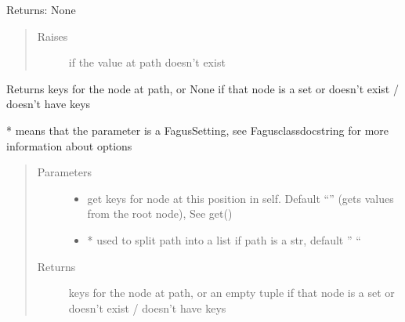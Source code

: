 \documentclass[a4paper,10pt,english]{sphinxmanual}
\begin{document}
\begin{fulllineitems}
\begin{fulllineitems}
\sphinxAtStartPar
Returns: None
\begin{quote}\begin{description}
\item[{Raises}] \leavevmode
\sphinxAtStartPar
{} \textendash{} if the value at path doesn’t exist

\end{description}\end{quote}

\end{fulllineitems}


\begin{fulllineitems}
\label{\detokenize{fagus.fagus:fagus.fagus.Fagus.keys}}
\pysigstartsignatures
{}
\pysigstopsignatures
\sphinxAtStartPar
Returns keys for the node at path, or None if that node is a set or doesn’t exist / doesn’t have keys

\sphinxAtStartPar
* means that the parameter is a Fagus\sphinxhyphen{}Setting, see Fagus\sphinxhyphen{}class\sphinxhyphen{}docstring for more information about options
\begin{quote}\begin{description}
\item[{Parameters}] \leavevmode\begin{itemize}
\item {}
\sphinxAtStartPar
{} \textendash{} get keys for node at this position in self. Default “” (gets values from the root node), See get()

\item {}
\sphinxAtStartPar
{} \textendash{} * used to split path into a list if path is a str, default ” “

\end{itemize}

\item[{Returns}] \leavevmode
\sphinxAtStartPar
keys for the node at path, or an empty tuple if that node is a set or doesn’t exist / doesn’t have keys


\end{description}
\end{quote}
\end{fulllineitems}
\end{fulllineitems}
\end{document}
